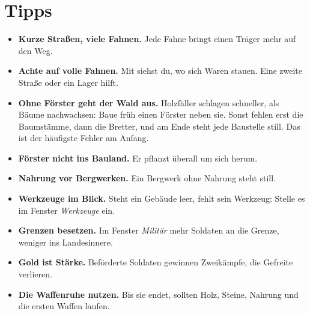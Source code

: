 \documentclass[a4paper,11pt,oneside,DIV=12,headings=small,toc=chapterentrydotfill]{scrbook}
\begin{document}
\chapter{Tipps}
\begin{itemize}
  \item \textbf{Kurze Straßen, viele Fahnen.} Jede Fahne bringt einen Träger mehr auf den Weg.
  \item \textbf{Achte auf volle Fahnen.} Mit  siehst du, wo sich Waren stauen. Eine zweite Straße oder ein
    Lager hilft.
  \item \textbf{Ohne Förster geht der Wald aus.} Holzfäller schlagen schneller, als Bäume nachwachsen: Baue
    früh einen Förster neben sie. Sonst fehlen erst die Baumstämme, dann die Bretter, und am Ende steht jede
    Baustelle still. Das ist der häufigste Fehler am Anfang.
  \item \textbf{Förster nicht ins Bauland.} Er pflanzt überall um sich herum.
  \item \textbf{Nahrung vor Bergwerken.} Ein Bergwerk ohne Nahrung steht still.
  \item \textbf{Werkzeuge im Blick.} Steht ein Gebäude leer, fehlt sein Werkzeug: Stelle es im Fenster
    \emph{Werkzeuge} ein.
  \item \textbf{Grenzen besetzen.} Im Fenster \emph{Militär} mehr Soldaten an die Grenze, weniger ins Landesinnere.
  \item \textbf{Gold ist Stärke.} Beförderte Soldaten gewinnen Zweikämpfe, die Gefreite verlieren.
  \item \textbf{Die Waffenruhe nutzen.} Bis sie endet, sollten Holz, Steine, Nahrung und die ersten Waffen laufen.
\end{itemize}

\appendix
\end{document}
